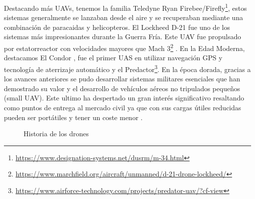 Destacando más UAVs, tenemos la familia Teledyne Ryan Firebee/Firefly\footnote{\url{https://www.designation-systems.net/dusrm/m-34.html}}, estos sistemas generalmente se lanzaban 
desde el aire y se recuperaban mediante una combinación de paracaidas y helicopteros. El Lockheed D-21 fue uno de los sistemas más impresionantes durante la Guerra Fría. 
Este UAV fue propulsado por estatorreactor con velocidades mayores que Mach 3\footnote{\url{https://www.marchfield.org/aircraft/unmanned/d-21-drone-lockheed/}} . 
En la Edad Moderna, destacamos El Condor \cite{CondorUAV}, fue el primer UAS en utilizar navegación GPS y tecnología de aterrizaje automático y el Predactor\footnote{\url{https://www.airforce-technology.com/projects/predator-uav/?cf-view}}. 
En la época dorada, gracias a los avances anteriores se pudo desarrollar sistemas militares esenciales que han demostrado su valor y el desarrollo de vehículos aéreos no 
tripulados pequeños (small UAV). Este ultimo ha despertado un gran interés significativo resaltando como puntos de entrega al mercado civil ya que con sus cargas útiles
reducidas pueden ser portátiles y tener un coste menor . \newline

\begin{figure}[H]
  \begin{center}
  \caption{Historia de los drones}
  \label{f:Drones}
  \end{center}
 \end{figure}


